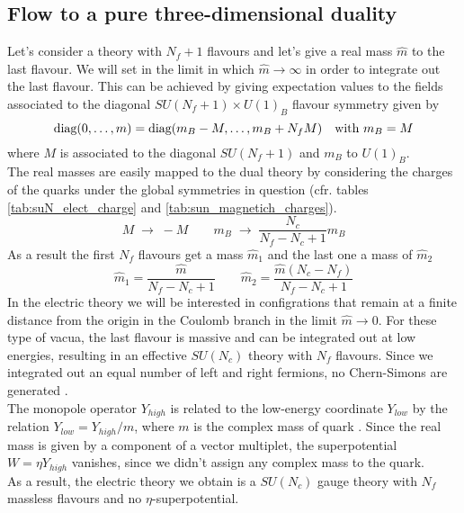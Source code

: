 \subsection{Flow to a pure three-dimensional duality}
\label{sec:seib_4dto3d_flow_massive}
Let's consider a theory with $N_f + 1$ flavours and let's give a real mass $\hat{m}$ to the last flavour.
We will set in the limit in which $\hat{m} \rightarrow \infty$ in order to integrate out the last flavour.
This can be achieved by giving expectation values to the fields associated to the diagonal $SU(N_f +1 ) \times U(1)_B$ flavour symmetry given by
\begin{equation}
  \hbox{diag}(0, \dots , m ) = \mbox{diag} (m_B - M, \dots , m_B + N_f M)  \quad \hbox{with } m_B = M 
   \end{equation}   
   where $M$ is associated to the diagonal $SU(N_f+1)$ and $m_B$ to $U(1)_B$.\\
 The real masses are easily mapped to the dual theory by considering the charges of the quarks under the global symmetries in question (cfr. tables \eqref{tab:suN_elect_charge} and \eqref{tab:sun_magnetich_charges}).
 \begin{equation}
  M \; \rightarrow \;  - M \qquad m_B \; \rightarrow \; \frac{N_c}{N_f - N_c +1} m_B
 \end{equation}
 As a result the first $N_f$ flavours get a mass $\hat{m}_1$ and the last one a mass of $\hat{m}_2$
 \begin{equation}
  \hat{m}_1 = \frac{ \hat{m}}{N_f - N_c +1} \qquad \hat{m}_2 = \frac{ \hat{m} (N_c - N_f)}{N_f -N_c +1 }
 \end{equation}
In the electric theory we will be interested in configrations that remain at a finite distance from the origin in the Coulomb branch in the limit $\hat{m} \rightarrow 0 $.
For these type of vacua, the last flavour is massive and can be integrated out at low energies, resulting in an effective $SU(N_c)$ theory with $N_f$ flavours.
Since we integrated out an equal number of left and right fermions, no Chern-Simons are generated \cite{Aharony:1997bx}.
\\
The monopole operator $Y_{high}$ is related to the low-energy coordinate $Y_{low}$ by the relation $Y_{low} = Y_{high}/ m $, where $m$ is the complex mass of quark \cite{Aharony:2013dha}.
Since the real mass is given by a component of a vector multiplet, the superpotential $W = \eta Y_{high}$ vanishes, since we didn't assign any complex mass to the quark.\\
As a result, the electric theory we obtain is a $SU(N_c)$ gauge theory with $N_f$ massless flavours and no $\eta$-superpotential. 
